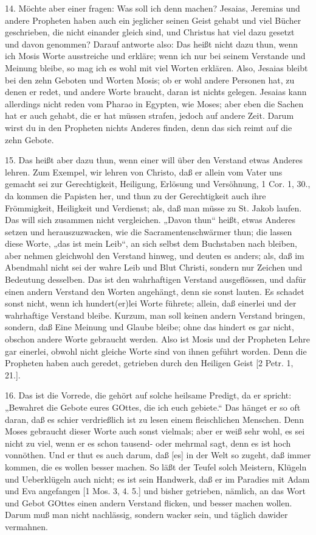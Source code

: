 14. Möchte aber einer fragen: Was soll ich denn machen? Jesaias, Jeremias und andere Propheten haben auch ein jeglicher seinen Geist gehabt und viel Bücher geschrieben, die nicht einander gleich sind, und Christus hat viel dazu gesetzt und davon genommen? Darauf antworte also: Das heißt nicht dazu thun, wenn ich Mosis Worte ausstreiche und erkläre; wenn ich nur bei seinem Verstande und Meinung bleibe, so mag
ich es wohl mit viel Worten erklären. Also, Jesaias bleibt bei den zehn Geboten und Worten Mosis; ob er wohl andere Personen hat, zu denen er redet, und andere Worte braucht, daran ist nichts gelegen. Jesaias kann allerdings nicht reden vom Pharao in Egypten, wie Moses; aber eben die Sachen hat er auch gehabt, die er hat müssen strafen, jedoch auf andere Zeit. Darum wirst du in den Propheten nichts Anderes finden, denn das sich reimt auf die zehn Gebote.

15. Das heißt aber dazu thun, wenn einer will über den Verstand etwas Anderes lehren. Zum Exempel, wir lehren von Christo, daß er allein vom Vater uns gemacht sei zur Gerechtigkeit, Heiligung, Erlösung und Versöhnung, 1 Cor. 1, 30., da kommen die Papisten her, und thun zu der Gerechtigkeit auch ihre Frömmigkeit, Heiligkeit und Verdienst; als, daß man müsse zu St. Jakob laufen. Das will sich zusammen nicht vergleichen. „Davon thun“ heißt, etwas Anderes setzen und herauszuzwacken, wie die Sacramentenschwärmer thun; die lassen diese Worte, „das ist mein Leib“, an sich selbst dem Buchstaben nach bleiben, aber nehmen gleichwohl den Verstand hinweg, und deuten es anders; als, daß im Abendmahl nicht sei der wahre Leib und Blut Christi, sondern nur Zeichen und Bedeutung desselben. Das ist den wahrhaftigen Verstand ausgeflössen, und dafür einen andern Verstand den Worten angehängt, denn sie sonst lauten. Es schadet sonst nicht, wenn ich hundert(er)lei Worte führete; allein, daß einerlei und der wahrhaftige Verstand bleibe. Kurzum, man soll keinen andern Verstand bringen, sondern, daß Eine Meinung und Glaube bleibe; ohne das hindert es gar nicht, obschon andere Worte gebraucht werden. Also ist Mosis und der Propheten Lehre gar einerlei, obwohl nicht gleiche Worte sind von ihnen geführt worden. Denn die Propheten haben auch geredet, getrieben durch den Heiligen Geist [2 Petr. 1, 21.].

16. Das ist die Vorrede, die gehört auf solche heilsame Predigt, da er spricht: „Bewahret die Gebote eures GOttes, die ich euch gebiete.“ Das hänget er so oft daran, daß es schier verdrießlich ist zu lesen einem fleischlichen Menschen. Denn Moses gebraucht dieser Worte auch sonst vielmals; aber er weiß sehr wohl, es sei nicht zu viel, wenn er es schon tausend- oder mehrmal sagt, denn es ist hoch vonnöthen. Und er thut es auch darum, daß [es] in der Welt so zugeht, daß immer kommen, die es wollen besser machen. So läßt der Teufel solch Meistern, Klügeln und Ueberklügeln auch nicht; es ist sein Handwerk, daß er im Paradies mit Adam und Eva angefangen [1 Mos. 3, 4. 5.] und bisher getrieben, nämlich, an das Wort und Gebot GOttes einen andern Verstand flicken, und besser machen wollen. Darum muß man nicht nachlässig, sondern wacker sein, und täglich dawider vermahnen.

